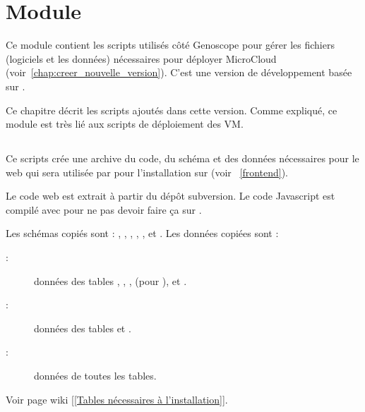 \chapter{Module \micWEBdeployVer} \label{chap:micwebdeploy}

Ce module contient les scripts utilisés côté Genoscope pour gérer les fichiers (logiciels et les données) nécessaires pour déployer MicroCloud (voir~\autoref{chap:creer_nouvelle_version}).
C'est une version de développement basée sur .

Ce chapitre décrit les scripts ajoutés dans cette version.
Comme expliqué, ce module est très lié aux scripts de déploiement des VM.

\section{}

Ce scripts crée une archive du code, du schéma et des données nécessaires pour le web
qui sera utilisée par  pour l'installation sur  (voir ~\autoref{frontend}).

Le code web est extrait à partir du dépôt subversion.
Le code Javascript est compilé avec  pour ne pas devoir faire ça sur .

Les schémas copiés sont : , , , , ,  et .
Les données copiées sont :
\begin{description}
    \item[:] données des tables , , ,  (pour ),
     et .
    \item[:] données des tables  et .
    \item[:] données de toutes les tables.
\end{description}

Voir page wiki \href{https://intranet.genoscope.cns.fr/agc/redmine/projects/microcloud/wiki/Tables_necessaires_a_installation}{[[Tables nécessaires à l'installation]]}.

\section{}

